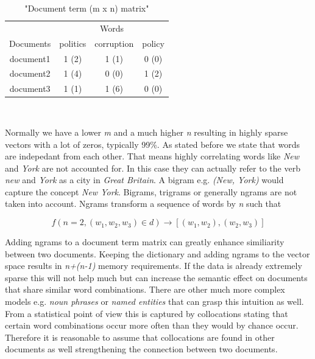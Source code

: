     \begin{table}[h!]
      \centering
      \begin{tabular}{c|c|c|c}
        \multicolumn{1}{r|}{} & \multicolumn{3}{c}{Words} \\
        \cline{1-4}
        Documents &   politics &   corruption &  policy  \\
        \hline
        document1 &    1 (2)   &     1 (1)    &   0 (0)  \\
        document2 &    1 (4)   &     0 (0)    &   1 (2)  \\
        document3 &    1 (1)   &     1 (6)    &   0 (0)  \\
      \end{tabular}\\
      \caption{"Document term (m x n) matrix"}
    \end{table}

    Normally we have a lower \emph{m} and a much higher \emph{n} resulting in highly sparse vectors with a lot of zeros, typically 99\%. As stated before we state that words are indepedant from each other. That means highly correlating words like \emph{New} and \emph{York} are not accounted for. In this case they can actually refer to the verb \emph{new} and \emph{York} as a city in \emph{Great Britain}. A bigram e.g. \emph{(New, York)} would capture the concept \emph{New York}. Bigrams, trigrams or generally ngrams are not taken into account. Ngrams transform a sequence of words by \emph{n} such that 

      \begin{equation}
        f(n = 2, (w_1, w_2, w_3) \in d) \to [(w_1, w_2),(w_2,w_3)]
      \end{equation}

    Adding ngrams to a document term matrix can greatly enhance similiarity between two documents. Keeping the dictionary and adding ngrams to the vector space results in \emph{n+(n-1)} memory requirements. If the data is already extremely sparse this will not help much but can increase the semantic effect on documents that share similar word combinations. There are other much more complex models e.g. \emph{noun phrases} or \emph{named entities} that can grasp this intuition as well. From a statistical point of view this is captured by collocations stating that certain word combinations occur more often than they would by chance occur. Therefore it is reasonable to assume that collocations are found in other documents as well strengthening the connection between two documents.


